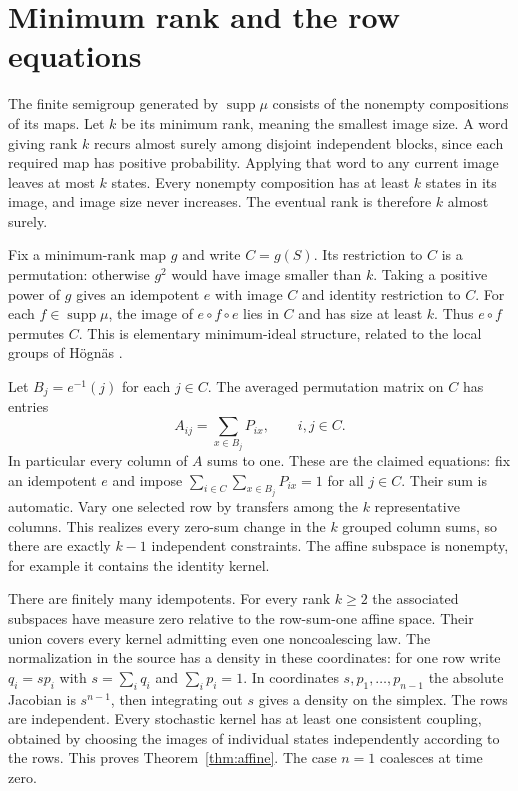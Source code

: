 \documentclass[11pt,a4paper]{amsart}
\newcommand{\supp}{\operatorname{supp}}
\begin{document}
\section{Minimum rank and the row equations}
The finite semigroup generated by $\supp\mu$ consists of the nonempty compositions of its maps. Let $k$ be its minimum rank, meaning the smallest image size. A word giving rank $k$ recurs almost surely among disjoint independent blocks, since each required map has positive probability. Applying that word to any current image leaves at most $k$ states. Every nonempty composition has at least $k$ states in its image, and image size never increases. The eventual rank is therefore $k$ almost surely.

Fix a minimum-rank map $g$ and write $C=g(S)$. Its restriction to $C$ is a permutation: otherwise $g^2$ would have image smaller than $k$. Taking a positive power of $g$ gives an idempotent $e$ with image $C$ and identity restriction to $C$. For each $f\in\supp\mu$, the image of $e\circ f\circ e$ lies in $C$ and has size at least $k$. Thus $e\circ f$ permutes $C$. This is elementary minimum-ideal structure, related to the local groups of H\"ogn\"as \cite[Theorem~2]{hognas}.

Let $B_j=e^{-1}(j)$ for each $j\in C$. The averaged permutation matrix on $C$ has entries
\[
               A_{ij}=\sum_{x\in B_j}P_{ix},\qquad i,j\in C .
\]
In particular every column of $A$ sums to one. These are the claimed equations: fix an idempotent $e$ and impose $\sum_{i\in C}\sum_{x\in B_j}P_{ix}=1$ for all $j\in C$. Their sum is automatic. Vary one selected row by transfers among the $k$ representative columns. This realizes every zero-sum change in the $k$ grouped column sums, so there are exactly $k-1$ independent constraints. The affine subspace is nonempty, for example it contains the identity kernel.

There are finitely many idempotents. For every rank $k\ge2$ the associated subspaces have measure zero relative to the row-sum-one affine space. Their union covers every kernel admitting even one noncoalescing law. The normalization in the source has a density in these coordinates: for one row write $q_i=s p_i$ with $s=\sum_i q_i$ and $\sum_i p_i=1$. In coordinates $s,p_1,\ldots,p_{n-1}$ the absolute Jacobian is $s^{n-1}$, then integrating out $s$ gives a density on the simplex. The rows are independent. Every stochastic kernel has at least one consistent coupling, obtained by choosing the images of individual states independently according to the rows. This proves Theorem~\ref{thm:affine}. The case $n=1$ coalesces at time zero.
\end{document}
